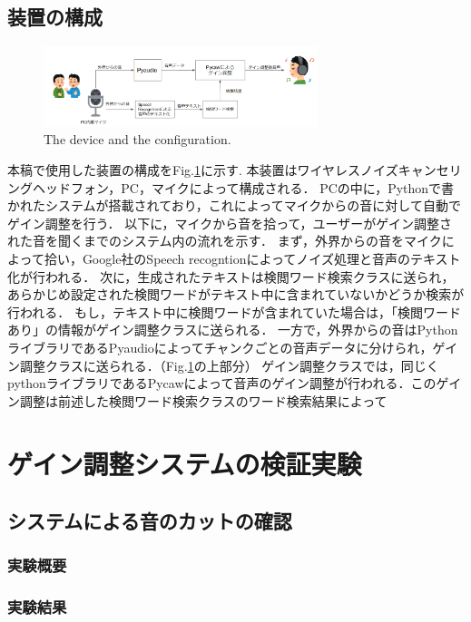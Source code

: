 \documentclass[a4paper]{jarticle}
\begin{document}
\subsection{装置の構成}
\begin{figure}[htbp]
    \begin{center}
    \includegraphics[width=80mm]{system.PNG}
    \caption{The device and the configuration.}
    \label{fig:system}
    \end{center}
    \end{figure}
本稿で使用した装置の構成をFig.\ref{fig:system}に示す.
本装置はワイヤレスノイズキャンセリングヘッドフォン，PC，マイクによって構成される．
PCの中に，Pythonで書かれたシステムが搭載されており，これによってマイクからの音に対して自動でゲイン調整を行う．
以下に，マイクから音を拾って，ユーザーがゲイン調整された音を聞くまでのシステム内の流れを示す．
まず，外界からの音をマイクによって拾い，Google社のSpeech recogntionによってノイズ処理と音声のテキスト化が行われる．
次に，生成されたテキストは検閲ワード検索クラスに送られ，あらかじめ設定された検閲ワードがテキスト中に含まれていないかどうか検索が行われる．
もし，テキスト中に検閲ワードが含まれていた場合は，「検閲ワードあり」の情報がゲイン調整クラスに送られる．
一方で，外界からの音はPythonライブラリであるPyaudioによってチャンクごとの音声データに分けられ，ゲイン調整クラスに送られる．（Fig.\ref{fig:system}の上部分）
ゲイン調整クラスでは，同じくpythonライブラリであるPycawによって音声のゲイン調整が行われる．このゲイン調整は前述した検閲ワード検索クラスのワード検索結果によって
    
\section{ゲイン調整システムの検証実験}
\subsection{システムによる音のカットの確認}
\subsubsection{実験概要}
\subsubsection{実験結果}
\end{document}
